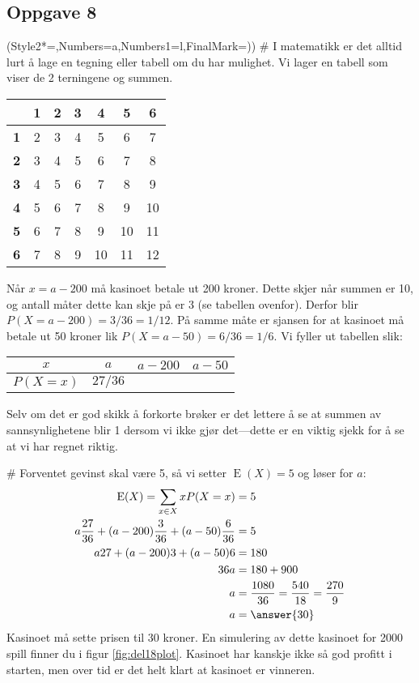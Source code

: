 \subsection*{Oppgave 8}
\begin{easylist}[enumerate]
	\ListProperties(Style2*=,Numbers=a,Numbers1=l,FinalMark={)})
	# I matematikk er det alltid lurt å lage en tegning eller tabell om du har mulighet.
	Vi lager en tabell som viser de 2 terningene og summen.
	\begin{center}
		\begin{tabular}{c|cccccc}
			& \textbf{1} & \textbf{2} & \textbf{3} & \textbf{4} & \textbf{5} & \textbf{6}  \\ \hline
		  \textbf{1} & 2 & 3 & 4 & 5 & 6 & 7  \\
		  \textbf{2} & 3 & 4 & 5 & 6 & 7 & 8  \\
		  \textbf{3} & 4 & 5 & 6 & 7 & 8 & 9  \\
		  \textbf{4} & 5 & 6 & 7 & 8 & 9 & 10  \\
		  \textbf{5} & 6 & 7 & 8 & 9 & 10 & 11  \\
		  \textbf{6} & 7 & 8 & 9 & 10 & 11 & 12  
		\end{tabular}
	\end{center}
	Når $x = a-200$ må kasinoet betale ut 200 kroner. Dette skjer når summen er 10, og antall måter dette kan skje på er 3 (se tabellen ovenfor). Derfor blir $P(X = a - 200) = 3 / 36 = 1/12$.
	På samme måte er sjansen for at kasinoet må betale ut 50 kroner lik $P(X = a - 50) = 6 / 36 = 1/6$.
	Vi fyller ut tabellen slik:
\begin{center}
	\begin{tabular}{|c|c|c|c|}
		\hline
		$x$ & $a$ & $a-200$ & $a-50$ \\ \hline
		$P(X = x)$ & $27 / 36$ & \answer{$3/36 = 1/12$} & \answer{$6/36 = 1/6$} \\ \hline
	\end{tabular}
\end{center}
	Selv om det er god skikk å forkorte brøker er det lettere å se at summen av sannsynlighetene blir 1 dersom vi ikke gjør det---dette er en viktig sjekk for å se at vi har regnet riktig.
	
	# Forventet gevinst skal være 5, så vi setter $\operatorname{E}(X) = 5$ og løser for $a$:
	\begin{align*}
		\operatorname{E}(X) = \sum_{x \in X} x P(X = x) &= 5 \\
		 a\frac{27}{36} + (a-200)\frac{3}{36}+ (a-50)\frac{6}{36} &= 5 \\
		a27 + (a-200)3 + (a-50)6 &= 180 \\
		36a &= 180 + 900 \\
		a &= \frac{1080}{36} = \frac{540}{18} = \frac{270}{9} \\
		a &= \answer{30} 
	\end{align*}
	Kasinoet må sette prisen til 30 kroner. En simulering av dette kasinoet for 2000 spill finner du i figur \ref{fig:del18plot}. Kasinoet har kanskje ikke så god profitt i starten, men over tid er det helt klart at kasinoet er vinneren.
	

\end{easylist}
